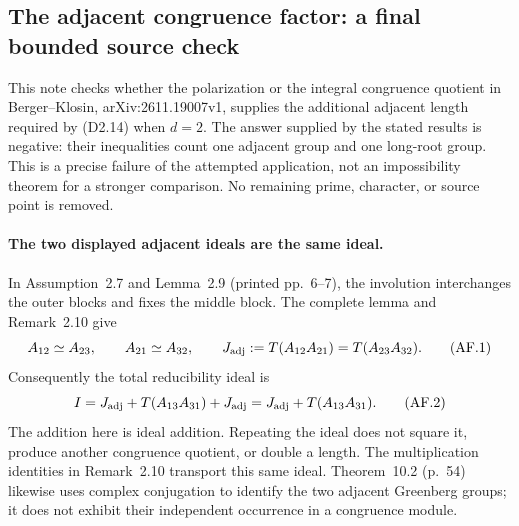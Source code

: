 \subsection{The adjacent congruence factor: a final bounded source check}

This note checks whether the polarization or the integral congruence
quotient in Berger--Klosin, arXiv:2611.19007v1, supplies the additional
adjacent length required by (D2.14) when $d=2$.  The answer supplied by
the stated results is negative: their inequalities count one adjacent
group and one long-root group.  This is a precise failure of the
attempted application, not an impossibility theorem for a stronger
comparison.  No remaining prime, character, or source point is removed.

\paragraph{The two displayed adjacent ideals are the same ideal.}
In Assumption~2.7 and Lemma~2.9 (printed pp.~6--7), the involution
interchanges the outer blocks and fixes the middle block.  The complete
lemma and Remark~2.10 give
\[
 A_{12}\simeq A_{23},\qquad A_{21}\simeq A_{32},\qquad
 J_{\rm adj}:=T(A_{12}A_{21})=T(A_{23}A_{32}).                 \tag{AF.1}
\]
Consequently the total reducibility ideal is
\[
 I=J_{\rm adj}+T(A_{13}A_{31})+J_{\rm adj}
   =J_{\rm adj}+T(A_{13}A_{31}).                              \tag{AF.2}
\]
The addition here is ideal addition.  Repeating the ideal does not
square it, produce another congruence quotient, or double a length.
The multiplication identities in Remark~2.10 transport this same ideal.
Theorem~10.2 (p.~54) likewise uses complex conjugation to identify the
two adjacent Greenberg groups; it does not exhibit their independent
occurrence in a congruence module.

